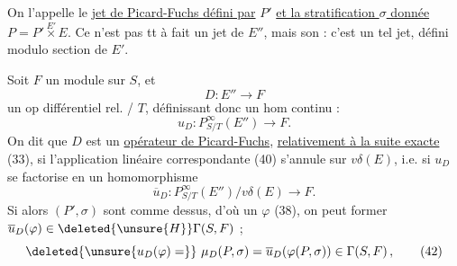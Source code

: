 On l'appelle le  \uline{jet de Picard-Fuchs défini par} $P'$  \uline{et la stratification $\sigma$ donnée}  $P=P'\mathbin{\overset{E'}{\times}}E$. Ce n'est pas tt à fait un jet  de $E''$, mais son   : c'est  un tel jet, défini modulo   section de  $E'$.

Soit $F$ un module  sur  $S$, et
\[
 D:E''\longrightarrow F \tag*{(39)}
\]
un op différentiel  rel. / $T$, définissant donc un hom  continu : 
\[
 u_D:P^\infty_{S/T}(E'')\longrightarrow F . \tag*{(40)}
\]
On dit que  $D$ est un \uline{opérateur de Picard-Fuchs}, \uline{relativement à la suite exacte} (33), si l'application linéaire correspondante (40) s'annule sur $v\delta(E)$, i.e. si $u_D$ se factorise en un homomorphisme
\[
 \overline u_D:P^\infty_{S/T}(E'')/v\delta(E)\longrightarrow F . \tag*{(41)}
\]
 Si alors $(P',\sigma)$ sont comme dessus, d'où un $\varphi$ (38), on peut former $\overline u_D(\varphi)\in\deleted{\unsure{H}}\Gamma(S,F)$ ; 
\[
 \deleted{\unsure{u_D(\varphi)=}}\ \mu_D(P,\sigma)=\overline u_D(\varphi(P,\sigma))\in\Gamma(S,F)\,, \tag*{(42)}
\]
